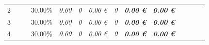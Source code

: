 \begin{table}[]
\begin{tabular}{cllllrrrcrrrrrr}
2                                                                                       & \multicolumn{2}{l}{\cellcolor[HTML]{FFFF99}\textit{}}                                & \cellcolor[HTML]{FFFF99}                            & \multicolumn{1}{r}{\cellcolor[HTML]{FFFF99}30.00\%} & \cellcolor[HTML]{FFFF99}\textit{0.00}                             & \cellcolor[HTML]{FFFF99}\textit{0}                         & \textit{0.00 €}                                              & \cellcolor[HTML]{FFFF99}\textit{0}                        & \cellcolor[HTML]{92D050}\textit{\textbf{0.00 €}}                         & \cellcolor[HTML]{FFFF99}\textit{\textbf{0.00 €}}                              & \cellcolor[HTML]{92D050}\textit{}                     & \cellcolor[HTML]{FFFF99}\textit{}                     & \cellcolor[HTML]{BFBFBF}\textit{\textbf{}}                        & \textit{\textbf{}}                                             \\
3                                                                                       & \multicolumn{2}{l}{\cellcolor[HTML]{FFFF99}\textit{}}                                & \cellcolor[HTML]{FFFF99}                            & \multicolumn{1}{r}{\cellcolor[HTML]{FFFF99}30.00\%} & \cellcolor[HTML]{FFFF99}\textit{0.00}                             & \cellcolor[HTML]{FFFF99}\textit{0}                         & \textit{0.00 €}                                              & \cellcolor[HTML]{FFFF99}\textit{0}                        & \cellcolor[HTML]{92D050}\textit{\textbf{0.00 €}}                         & \cellcolor[HTML]{FFFF99}\textit{\textbf{0.00 €}}                              & \cellcolor[HTML]{92D050}\textit{}                     & \cellcolor[HTML]{FFFF99}\textit{}                     & \cellcolor[HTML]{BFBFBF}\textit{\textbf{}}                        & \textit{\textbf{}}                                             \\
4                                                                                       & \multicolumn{2}{l}{\cellcolor[HTML]{FFFF99}\textit{}}                                & \cellcolor[HTML]{FFFF99}                            & \multicolumn{1}{r}{\cellcolor[HTML]{FFFF99}30.00\%} & \cellcolor[HTML]{FFFF99}\textit{0.00}                             & \cellcolor[HTML]{FFFF99}\textit{0}                         & \textit{0.00 €}                                              & \cellcolor[HTML]{FFFF99}\textit{0}                        & \cellcolor[HTML]{92D050}\textit{\textbf{0.00 €}}                         & \cellcolor[HTML]{FFFF99}\textit{\textbf{0.00 €}}                              & \cellcolor[HTML]{92D050}\textit{}                     & \cellcolor[HTML]{FFFF99}\textit{}                     & \cellcolor[HTML]{BFBFBF}\textit{\textbf{}}                        & \textit{\textbf{}}                                             \\

\end{tabular}
\end{table}
